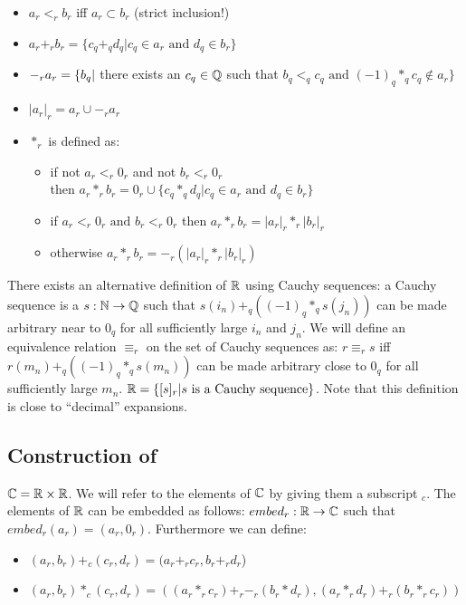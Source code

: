 \begin{itemize}
  \item $a_r <_r b_r$ iff $a_r \subset b_r$ (strict inclusion!)
  \item $a_r +_r b_r = \{c_q +_q d_q | c_q \in a_r \mbox{ and } d_q \in b_r\}$
  \item $-_r a_r = \\
  \{b_q |$ there exists an $c_q \in \mathbb Q$ such that $b_q <_q c_q \mbox{ and
  } (-1)_q *_q c_q \not\in a_r\}$
  \item $|a_r|_r = a_r \cup -_r a_r$
  \item $*_r$ is defined as:
  \begin{itemize}
    \item if not $a_r <_r 0_r$ and not $b_r <_r 0_r$ \\ then $a_r *_r b_r =
            0_r \cup \{c_q *_q d_q | c_q \in a_r \mbox{ and } d_q \in b_r\}$
    \item if $a_r <_r 0_r \mbox{ and } b_r <_r 0_r$ then $a_r *_r b_r =
            |a_r|_r *_r |b_r|_r$
    \item otherwise $a_r *_r b_r = -_r (|a_r|_r *_r |b_r|_r)$
  \end{itemize}
\end{itemize}

There exists an alternative definition of $\mathbb R$ using Cauchy sequences: a
Cauchy sequence is a $s: \mathbb N \rightarrow \mathbb Q$ such that $s(i_n) +_q
\left((-1)_q *_q s(j_n)\right)$ can be made arbitrary near to $0_q$ for
all sufficiently large $i_n$ and $j_n$. We will define an equivalence
relation $\equiv_r$ on the set of Cauchy sequences as: $r \equiv_r s$
iff $r(m_n) +_q \left((-1)_q *_q s(m_n)\right)$ can be made arbitrary
close to $0_q$ for all sufficiently large $m_n$. $\mathbb R = \{ [s]_r | s
\mbox{ is a Cauchy sequence}\}$.  Note that this definition is close to
``decimal'' expansions.

\subsection{Construction of \C}

$\mathbb C = \mathbb R \times \mathbb R$. We will refer to the elements of $\mathbb C$ by giving
them a subscript $_c$. The elements of $\mathbb R$ can be embedded as follows:
$embed_r: \mathbb R \rightarrow \mathbb C$ such that $embed_r(a_r) = (a_r,0_r)$.
Furthermore we can define:
\begin{itemize}
\item $(a_r,b_r) +_c (c_r,d_r) = (a_r +_r c_r, b_r +_r d_r$)
\item $(a_r,b_r) *_c (c_r,d_r) = \left((a_r *_r c_r) +_r -_r (b_r * d_r),
      (a_r *_r d_r) +_r (b_r *_r c_r)\right)$
\end{itemize}

